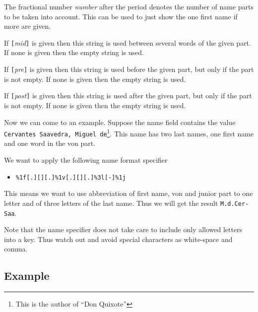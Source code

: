 \documentclass[11pt,a4paper]{scrbook}
\begin{document}
The fractional number \textit{number} after the period denotes the number of
name parts to be taken into account. This can be used to just show the one
first name if more are given.

If \texttt{[}\textit{mid}\texttt{]} is given then this string is used between
several words of the given part. If none is given then the empty string is
used.

If \texttt{[}\textit{pre}\texttt{]} is given then this string is used before
the given part, but only if the part is not empty. If none is given then the
empty string is used.

If \texttt{[}\textit{post}\texttt{]} is given then this string is used after
the given part, but only if the part is not empty. If none is given then the
empty string is used.


Now we can come to an example. Suppose the name field contains the value
\texttt{Cervantes Saavedra, Miguel de}\footnote{This is the author of ``Don
  Quixote''}. This name has two last names, one first name and one word in the
von part.

We want to apply the following name format specifier

\begin{itemize}
  \item [] \verb|%1f[.][][.]|\verb|%1v[.][][.]|\verb|%3l[-]|\verb|%1j| 
\end{itemize}

This means we want to use abbreviation of first name, von and junior part to
one letter and of three letters of the last name. Thus we will get the result
\verb|M.d.Cer-Saa|.

Note that the name specifier does not take care to include only allowed
letters into a key. Thus watch out and avoid special characters as white-space
and comma.


\subsection{Example}
\end{document}
